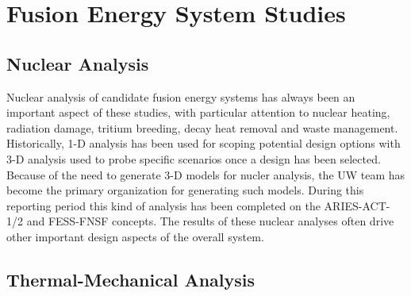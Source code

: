 \section{Fusion Energy System Studies}

\subsection{Nuclear Analysis}

Nuclear analysis of candidate fusion energy systems has always been an
important aspect of these studies, with particular attention to nuclear
heating, radiation damage, tritium breeding, decay heat removal and waste
management.  Historically, 1-D analysis has been used for scoping potential
design options with 3-D analysis used to probe specific scenarios once a
design has been selected.  Because of the need to generate 3-D models for
nucler analysis, the UW team has become the primary organization for
generating such models.  During this reporting period this kind of analysis
has been completed on the ARIES-ACT-1/2 and FESS-FNSF concepts.  The results
of these nuclear analyses often drive other important design aspects of the
overall system.




\subsection{Thermal-Mechanical Analysis}
